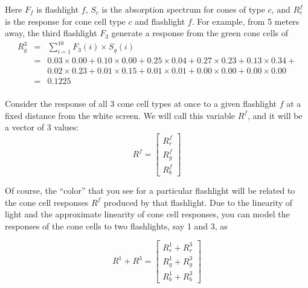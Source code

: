 \documentclass[10pt,letterpaper]{article}
\begin{document}
Here $F_f$ is flashlight $f$, $S_c$ is the absorption spectrum for cones of type $c$, and $R^f_c$ is the response for cone cell type $c$ and flashlight $f$. For example, from 5 meters away, the third flashlight $F_3$ generate a response from the green cone cells of\\
\begin{eqnarray*}
R^3_g &=& \sum_{i=1}^{10} F_3 (i) \times S_g(i) \\
&=& 0.03\times0.00 + 0.10\times0.00 + 0.25\times0.04 + 0.27\times0.23 + 0.13\times0.34 + \\ 
&~& 0.02\times0.23 + 0.01\times0.15 + 0.01\times0.01 + 0.00\times0.00 + 0.00\times0.00 \\
&=& 0.1225\\
\end{eqnarray*}

Consider the response of all 3 cone cell types at once to a given flashlight $f$
at a fixed distance from the white screen. We will call this variable $R^f$, and it will be a vector of 3 values:
\[
	R^f = \left[ \begin{array}{c}
				R^f_r \\
				R^f_g \\				
				R^f_b \end{array} \right]
\]

Of course, the “color” that you see for a particular flashlight will be related
to the cone cell responses $R^f$ produced by that flashlight. Due to the linearity
of light and the approximate linearity of cone cell responses, you can model the
responses of the cone cells to two flashlights, say 1 and 3, as

\[
	R^1 + R^3 = \left[ \begin{array}{c}
				R^1_r + R^3_r\\
				R^1_g + R^3_g\\				
				R^1_b + R^3_b\end{array} \right]
\]
\end{document}
